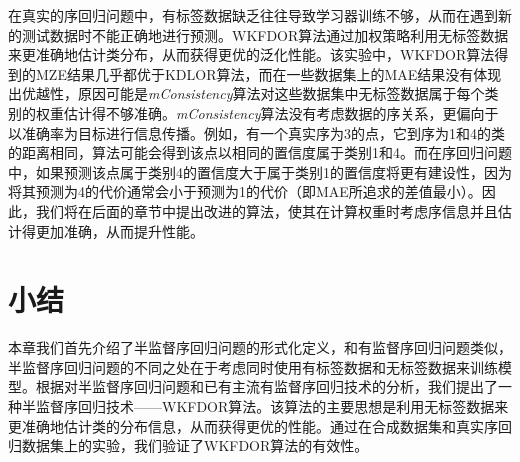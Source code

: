 在真实的序回归问题中，有标签数据缺乏往往导致学习器训练不够，从而在遇到新的测试数据时不能正确地进行预测。WKFDOR算法通过加权策略利用无标签数据来更准确地估计类分布，从而获得更优的泛化性能。该实验中，WKFDOR算法得到的MZE结果几乎都优于KDLOR算法，而在一些数据集上的MAE结果没有体现出优越性，原因可能是\textit{mConsistency}算法对这些数据集中无标签数据属于每个类别的权重估计得不够准确。\textit{mConsistency}算法没有考虑数据的序关系，更偏向于以准确率为目标进行信息传播。例如，有一个真实序为3的点，它到序为1和4的类的距离相同，算法可能会得到该点以相同的置信度属于类别1和4。而在序回归问题中，如果预测该点属于类别4的置信度大于属于类别1的置信度将更有建设性，因为将其预测为4的代价通常会小于预测为1的代价（即MAE所追求的差值最小）。因此，我们将在后面的章节中提出改进的算法，使其在计算权重时考虑序信息并且估计得更加准确，从而提升性能。

\section{小结}
本章我们首先介绍了半监督序回归问题的形式化定义，和有监督序回归问题类似，半监督序回归问题的不同之处在于考虑同时使用有标签数据和无标签数据来训练模型。根据对半监督序回归问题和已有主流有监督序回归技术的分析，我们提出了一种半监督序回归技术——WKFDOR算法。该算法的主要思想是利用无标签数据来更准确地估计类的分布信息，从而获得更优的性能。通过在合成数据集和真实序回归数据集上的实验，我们验证了WKFDOR算法的有效性。








